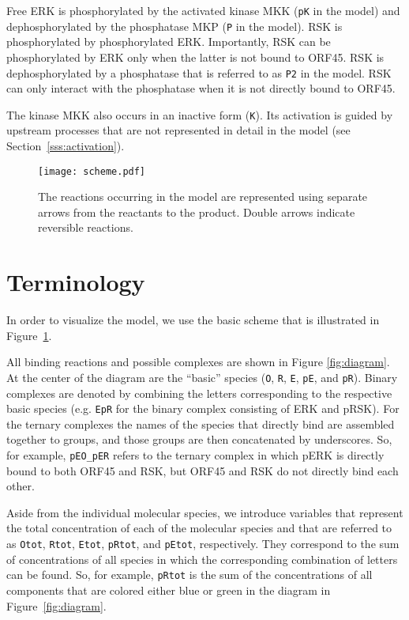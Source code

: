 \documentclass[12pt]{article}
\begin{document}
	Free ERK is phosphorylated by the activated kinase MKK (\texttt{pK} in the model)
	and dephosphorylated by the phosphatase MKP (\texttt{P} in the model). RSK is phosphorylated by phosphorylated ERK. Importantly, RSK can be phosphorylated by ERK only when the latter is not bound to ORF45. RSK is dephosphorylated by a phosphatase that is referred to as \texttt{P2} in the model. RSK can only interact with the phosphatase when it is not directly bound to ORF45.
	
	The kinase MKK also occurs in an inactive form (\texttt{K}).
	Its activation is guided by upstream processes that are not represented
	in detail in the model (see Section~\ref{sss:activation}).
	
	\begin{figure}[h!]
		\centering \texttt{[image: scheme.pdf]}
		\caption{The reactions occurring in the model are represented using separate
			arrows from the reactants to the product. Double arrows indicate reversible
			reactions.}
		\label{fig:scheme} 
	\end{figure}
	
	
	\section{Terminology}
	
	In order to visualize the model, we use the basic scheme
	that is illustrated in Figure~\ref{fig:scheme}.
	
	All binding reactions and possible complexes are shown in Figure \ref{fig:diagram}. At the center of the diagram are the ``basic'' species (\texttt{O}, \texttt{R}, \texttt{E}, \texttt{pE}, and \texttt{pR}). Binary complexes are denoted by combining the letters corresponding to the respective
	basic species (e.g. \texttt{EpR} for the binary complex consisting
	of ERK and pRSK). For the ternary complexes the names of the species	that directly bind are assembled together to groups, and those groups are then concatenated by underscores. So, for example, \texttt{pEO\_pER} refers to the ternary complex in which pERK is directly bound to both ORF45 and RSK, but ORF45 and RSK do not directly bind each other.
	
	Aside from the individual molecular species, we introduce variables
	that represent the total concentration of each of the molecular species
	and that are referred to as \texttt{Otot}, \texttt{Rtot}, \texttt{Etot},
	\texttt{pRtot}, and \texttt{pEtot}, respectively. They correspond
	to the sum of concentrations of all species in which the corresponding
	combination of letters can be found. So, for example, \texttt{pRtot}
	is the sum of the concentrations of all components that are colored
	either blue or green in the diagram in Figure~\ref{fig:diagram}.
	
\end{document}
